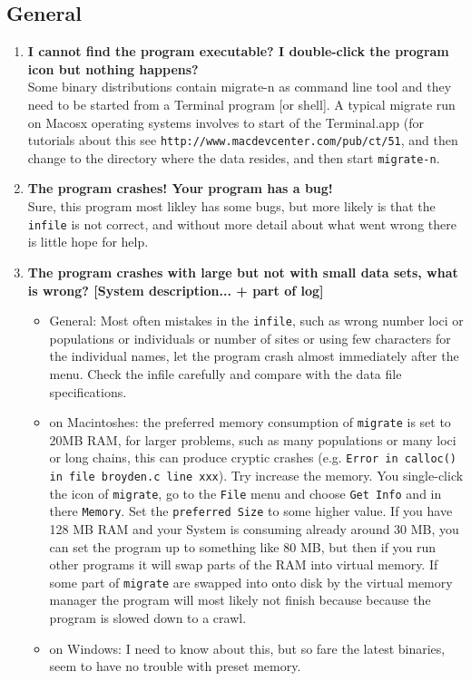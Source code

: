 \subsection{General}
\begin{enumerate}
\item {\bf  I cannot find the program executable? I double-click the program icon but nothing happens?}\\
Some binary distributions contain migrate-n as command line tool and they
need to be started from a Terminal program [or shell]. A typical migrate run on Macosx  operating systems involves to start of the Terminal.app (for tutorials
about this see {\tt http://www.macdevcenter.com/pub/ct/51}, and then 
change to the directory where the data resides, and then start {\tt migrate-n}.
\item {\bf The program crashes! Your program has a bug!}\\
Sure, this program most likley has some bugs, but more likely is that
the {\tt infile} is not correct, and without more detail about 
what went wrong there is 
little hope for help. 
\item {\bf The program crashes with large but not with small data sets, 
what is wrong? [System description... + part of log]}
\begin{itemize}
\item General: Most often mistakes in the {\tt infile}, such as wrong number
loci or populations or individuals or number of sites or using few characters for the individual names, let the program crash almost immediately after the 
menu. Check the infile carefully and compare with the data file specifications.
\item on Macintoshes: the preferred memory consumption of {\tt migrate} is set to 20MB RAM, for larger problems, such as many populations or 
many loci or long chains, this can produce cryptic crashes (e.g. 
{\tt Error in calloc() in file broyden.c line xxx}). Try increase the memory.
You single-click the icon of {\tt migrate}, go to the {\tt File} menu and 
choose {\tt Get Info} and in there {\tt Memory}. Set the {\tt preferred Size}
to some higher value. If you have 128 MB RAM and your System is 
consuming already around 30 MB, you can set the program up to something like 
80 MB, but then if you run other programs it will swap parts of the RAM into
virtual memory. If some part of {\tt migrate} are swapped into onto disk
by the virtual memory manager the program will most likely not finish because
because the program is slowed down to a crawl.
\item on Windows: I need to know about this, but so fare the latest binaries,
seem to have no trouble with preset memory.
\end{itemize}
\end{enumerate}
